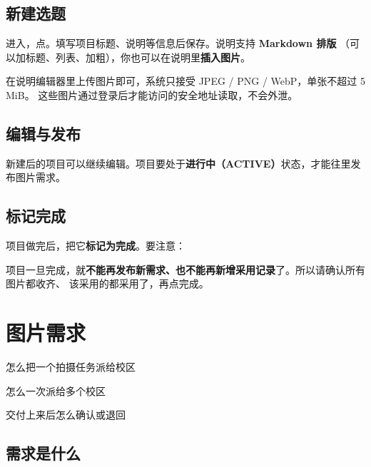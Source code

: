 \documentclass[cn,11pt,green]{elegantbook}
\begin{document}
\section{新建选题}

进入，点。填写项目标题、说明等信息后保存。说明支持 \textbf{Markdown 排版}
（可以加标题、列表、加粗），你也可以在说明里\textbf{插入图片}。

\begin{tipbox}[给说明配图]
  在说明编辑器里上传图片即可，系统只接受 JPEG / PNG / WebP，单张不超过 5 MiB。
  这些图片通过登录后才能访问的安全地址读取，不会外泄。
\end{tipbox}

\section{编辑与发布}

新建后的项目可以继续编辑。项目要处于\textbf{进行中（ACTIVE）}状态，才能往里发布图片需求。

\section{标记完成}

项目做完后，把它\textbf{标记为完成}。要注意：

\begin{warnbox}[完成会「锁定」项目]
  项目一旦完成，就\textbf{不能再发布新需求、也不能再新增采用记录}了。所以请确认所有图片都收齐、
  该采用的都采用了，再点完成。
\end{warnbox}

\chapter{图片需求}

\begin{introduction}
  \item 怎么把一个拍摄任务派给校区
  \item 怎么一次派给多个校区
  \item 交付上来后怎么确认或退回
\end{introduction}

\section{需求是什么}
\end{document}
